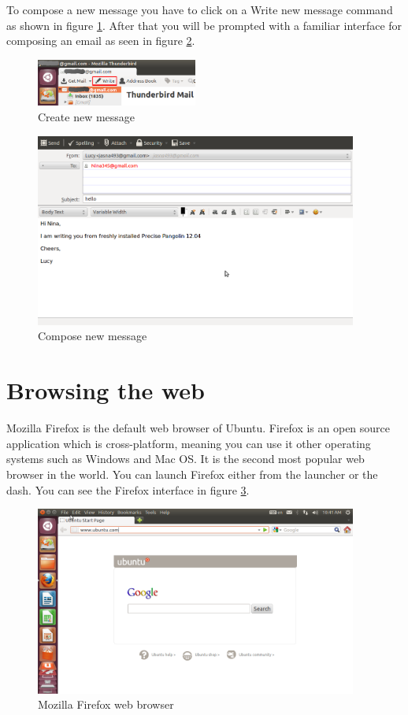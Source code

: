 \par \noindent To compose a new message you have to click on a Write new message command as shown in figure \ref{fig:thunderbird5}. After that you will be prompted with a familiar interface for composing an email as seen in figure \ref{fig:thunderbird6}.

\begin{figure}[h!]	
	\centering
	\includegraphics[width=150pt]{./images/basic-tasks/thunderbird5.png}
	\caption{Create new message}	
	\label{fig:thunderbird5}		
\end{figure}

\begin{figure}[h!]	
	\centering
	\includegraphics[width=300pt]{./images/basic-tasks/thunderbird6.png}
	\caption{Compose new message}	
	\label{fig:thunderbird6}		
\end{figure}

\section{Browsing the web} 
Mozilla Firefox is the default web browser of Ubuntu. Firefox is an open source application which is cross-platform, meaning you can use it other operating systems such as Windows and Mac OS. It is the second most popular web browser in the world. You can launch Firefox either from the launcher or the dash. You can see the Firefox interface in figure \ref{fig:firefox2}. \\

\begin{figure}[h!]	
	\centering
	\includegraphics[width=300pt]{./images/basic-tasks/firefox2.png}
	\caption{Mozilla Firefox web browser}	
	\label{fig:firefox2}		
\end{figure}

